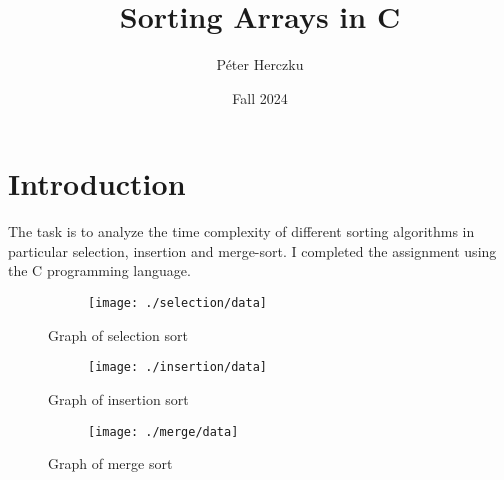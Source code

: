 \documentclass[a4paper,11pt]{article}
\begin{document}
    \title{
        \textbf{Sorting Arrays in C}
    }
    \author{Péter Herczku}
    \date{Fall 2024}

    \maketitle

    \section*{Introduction}

    The task is to analyze the time complexity of different sorting algorithms in particular selection, insertion and merge-sort.
    I completed the assignment using the C programming language.

    \begin{figure}[h]
        \centering
        \begin{subfigure}[b]{.5\textwidth}
            \centering
            \texttt{[image: ./selection/data]} %
        \end{subfigure}
        \caption{Graph of selection sort}
        \label{fig:graph_1}
    \end{figure}

    \begin{figure}[h]
        \centering
        \begin{subfigure}[b]{.5\textwidth}
            \centering
            \texttt{[image: ./insertion/data]} %
        \end{subfigure}
        \caption{Graph of insertion sort}
        \label{fig:graph_2}
    \end{figure}

    \begin{figure}[h]
        \centering
        \begin{subfigure}[b]{.5\textwidth}
            \centering
            \texttt{[image: ./merge/data]} %
        \end{subfigure}
        \caption{Graph of merge sort}
        \label{fig:graph_3}
    \end{figure}
\end{document}
